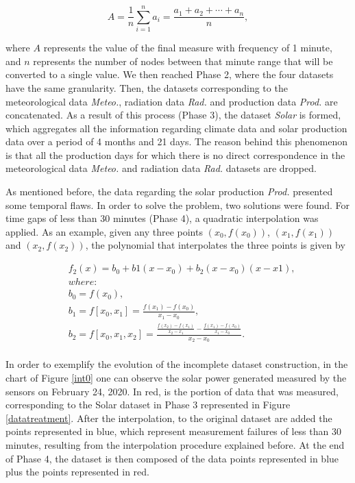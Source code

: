 \begin{equation}
     A={\frac {1}{n}}\sum _{i=1}^{n}a_{i}={\frac {a_{1}+a_{2}+\cdots +a_{n}}{n}},
\label{amean}
\end{equation}

where $A$ represents the value of the final measure with frequency of 1 minute, and $n$ represents the number of nodes between that minute range that will be converted to a single value. We then reached Phase 2, where the four datasets have the same granularity. Then, the datasets corresponding to the meteorological data \textit{Meteo.}, radiation data \textit{Rad.} and production data \textit{Prod.} are concatenated. As a result of this process (Phase 3), the dataset \textit{Solar} is formed, which aggregates all the information regarding climate data and solar production data over a period of 4 months and 21 days. The reason behind this phenomenon is that all the production days for which there is no direct correspondence in the meteorological data \textit{Meteo.} and radiation data \textit{Rad.} datasets are dropped. 

As mentioned before, the data regarding the solar production \textit{Prod.} presented some temporal flaws. In order to solve the problem, two solutions were found. For time gaps of less than 30 minutes (Phase 4), a quadratic interpolation was applied. As an example, given any three points $(x_0, f(x_0))$, $(x_1, f(x_1))$ and $(x_2, f(x_2))$, the polynomial that interpolates the three points is given by

\begin{equation}
\begin{split}
     & f_2(x)=b_0+b1(x-x_0)+b_2(x-x_0)(x-x1),\\
     & where:\\
     & b_0=f(x_0),\\
     & b_1=f[x_0,x_1]=\frac{f(x_1)-f(x_0)}{x_1-x_0},\\
     & b_2=f[x_0,x_1,x_2]=\frac{\frac{f(x_2)-f(x_1)}{x_2-x_1}-\frac{f(x_1)-f(x_0)}{x_1-x_0}}{x_2-x_0}.\\
\end{split}
\label{poly}
\end{equation}


In order to exemplify the evolution of the incomplete dataset construction, in the chart of Figure \ref{int0} one can observe the solar power generated measured by the sensors on February 24, 2020. In red, is the portion of data that was measured, corresponding to the Solar dataset in Phase 3 represented in Figure \ref{datatreatment}. After the interpolation, to the original dataset are added the points represented in blue, which represent measurement failures of less than 30 minutes, resulting from the interpolation procedure explained before. At the end of Phase 4, the dataset is then composed of the data points represented in blue plus the points represented in red.



